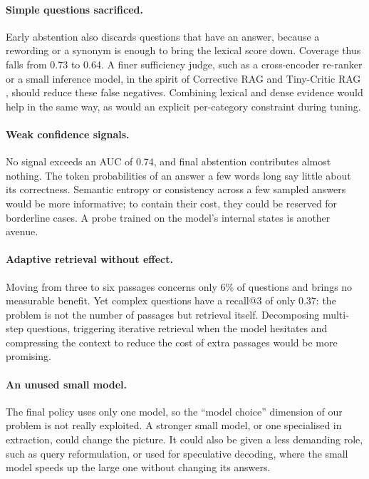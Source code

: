 \documentclass[11pt,a4paper]{article}
\begin{document}
\paragraph{Simple questions sacrificed.} Early abstention also discards questions that have an answer,
because a rewording or a synonym is enough to bring the lexical score down. Coverage thus falls from 0.73
to 0.64. A finer sufficiency judge, such as a cross-encoder re-ranker or a small inference model, in the
spirit of Corrective RAG \citep{yan2024crag} and Tiny-Critic RAG \citep{wu2026tinycritic}, should reduce
these false negatives. Combining lexical and dense evidence would help in the same way, as would an
explicit per-category constraint during tuning.

\paragraph{Weak confidence signals.} No signal exceeds an AUC of 0.74, and final abstention contributes
almost nothing. The token probabilities of an answer a few words long say little about its correctness.
Semantic entropy \citep{kuhn2023semantic} or consistency across a few sampled answers would be more
informative; to contain their cost, they could be reserved for borderline cases. A probe trained on the
model's internal states \citep{kadavath2022know} is another avenue.

\paragraph{Adaptive retrieval without effect.} Moving from three to six passages concerns only 6\% of
questions and brings no measurable benefit. Yet complex questions have a recall@3 of only 0.37: the
problem is not the number of passages but retrieval itself. Decomposing multi-step questions, triggering
iterative retrieval when the model hesitates \citep{jiang2023flare,su2024dragin} and compressing the
context to reduce the cost of extra passages \citep{arefeen2024leancontext} would be more promising.

\paragraph{An unused small model.} The final policy uses only one model, so the ``model choice''
dimension of our problem is not really exploited. A stronger small model, or one specialised in
extraction, could change the picture. It could also be given a less demanding role, such as query
reformulation, or used for speculative decoding, where the small model speeds up the large one without
changing its answers.
\end{document}
